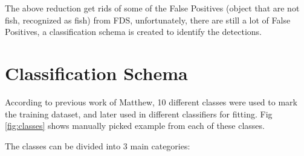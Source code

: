 \documentclass[bsc,logo,twoside,fullspacing,parskip]{infthesis}
\begin{document}
The above reduction get rids of some of the False Positives (object that are not fish, recognized as fish) from FDS, unfortunately, there are still a lot of False Positives, a classification schema is created to identify the detections.

\section{Classification Schema}
\label{sec:schema}

According to previous work of Matthew, 10 different classes were used to mark the training dataset, and later used in different classifiers for fitting. 
Fig \ref{fig:classes} shows manually picked example from each of these classes.

The classes can be divided into 3 main categories:
\end{document}
